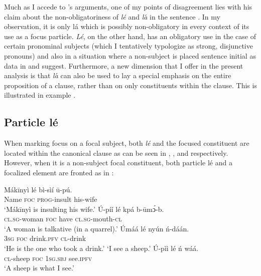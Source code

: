 \documentclass[output=paper,colorlinks,citecolor=brown]{langscibook}
\begin{document}
Much as I accede to \citeauthor{Schwarz2009}’s arguments, one of my points of disagreement lies with his claim about the non-obligatoriness of \textit{lé} and \textit{la}́ in the sentence \citep[184--185]{Schwarz2009}. In my observation, it is only lá which is possibly non-obligatory in every context of its use as a focus particle. \textit{Lé}, on the other hand, has an obligatory use in the case of certain pronominal subjects (which I tentatively typologize as strong, disjunctive pronouns) and also in a situation where a non-subject is placed sentence initial as data in  and  suggest. Furthermore, a new dimension that I offer in the present analysis is that \textit{la}́ can also be used to lay a special emphasis on the entire proposition of a clause, rather than on only constituents within the clause. This is illustrated in example .

\subsection{Particle lé}\label{sec:bisilki:7.1}

When marking focus on a focal subject, both \textit{lé} and the focused constituent are located within the canonical clause as can be seen in , , and  respectively. However, when it is a non-subject focal constituent, both particle lé and a focalized element are fronted as in :

\ea%
    \label{ex:bisilki:22}
    \ea\label{ex:bisilki:22a}
    \gll    Mákīnyì	lé	bì-sìí	ū-pú.\\
            Name	\textsc{foc}	\textsc{prog-}insult		his-wife\\
    \glt    ‘Mákīnyì is insulting his wife.’
    \ex\label{ex:bisilki:22b}
    \gll    Ú-píí			lé	kpá	b-ūmͻ́-b.\\
            \textsc{cl.sg-}woman	\textsc{foc}	have	\textsc{cl.sg-}mouth\textsc{-cl}\\
    \glt    ‘A woman is talkative (in a quarrel).’
    \ex\label{ex:bisilki:22c}
    \gll    Úmáá		lé	nyún		ń-dáán.\\
            \textsc{3sg}		\textsc{foc}	drink\textsc{.pfv}	\textsc{cl-}drink\\
    \glt    ‘He is the one who took a drink.’
    \glt    ‘I see a sheep.’
    \ex\label{ex:bisilki:22e}
    \gll    Ú-pìì		lé	ń		wáá.\\
            \textsc{cl-}sheep	\textsc{foc}	\textsc{1sg.sbj}	see\textsc{.ipfv}\\
    \glt    ‘A sheep is what I see.’
    \z
\z
\end{document}
